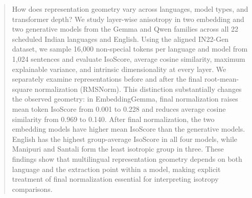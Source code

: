 \begin{abstract}
How does representation geometry vary across languages, model types,
and transformer depth? We study layer-wise anisotropy in two embedding
and two generative models from the Gemma and Qwen families across
all 22 scheduled Indian languages and English. Using the aligned
IN22-Gen dataset, we sample 16,000 non-special tokens per language
and model from 1,024 sentences and evaluate IsoScore, average cosine
similarity, maximum explainable variance, and intrinsic dimensionality
at every layer. We separately examine representations before and after
the final root-mean-square normalization (RMSNorm). This distinction
substantially changes the observed geometry: in EmbeddingGemma,
final normalization raises mean token IsoScore from 0.001 to 0.228
and reduces average cosine similarity from 0.969 to 0.140. After final normalization, the two embedding
models have higher mean IsoScore than the generative models. English has the highest
group-average IsoScore in all four models, while Manipuri and Santali
form the least isotropic group in three. These findings show that
multilingual representation geometry depends on both language
and the extraction point within a model, making explicit treatment of
final normalization essential for interpreting isotropy comparisons.
\end{abstract}
